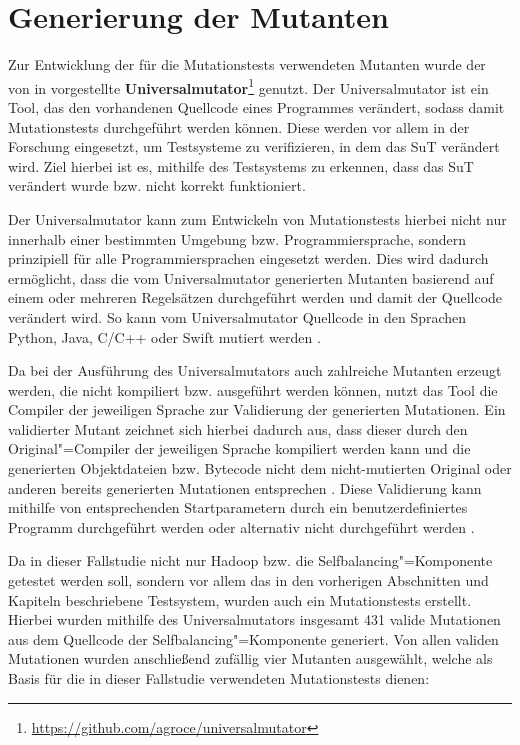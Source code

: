 \section{Generierung der Mutanten}
\label{sec:implMutationTests}

Zur Entwicklung der für die Mutationstests verwendeten Mutanten wurde der von \citeauthor{Groce2018} in \cite{Groce2018} vorgestellte \textbf{Universalmutator}\footnote{\url{https://github.com/agroce/universalmutator}} genutzt.
Der Universalmutator ist ein Tool, das den vorhandenen Quellcode eines Programmes verändert, sodass damit Mutationstests durchgeführt werden können.
Diese werden vor allem in der Forschung eingesetzt, um Testsysteme zu verifizieren, in dem das \ac{SuT} verändert wird.
Ziel hierbei ist es, mithilfe des Testsystems zu erkennen, dass das \ac{SuT} verändert wurde bzw. nicht korrekt funktioniert.

Der Universalmutator kann zum Entwickeln von Mutationstests hierbei nicht nur innerhalb einer bestimmten Umgebung bzw. Programmiersprache, sondern prinzipiell für alle Programmiersprachen eingesetzt werden.
Dies wird dadurch ermöglicht, dass die vom Universalmutator generierten Mutanten basierend auf einem oder mehreren Regelsätzen durchgeführt werden und damit der Quellcode verändert wird.
So kann vom Universalmutator Quellcode \uA in den Sprachen Python, Java, C/C++ oder Swift mutiert werden \cite{Groce2018}.

Da bei der Ausführung des Universalmutators auch zahlreiche Mutanten erzeugt werden, die nicht kompiliert bzw. ausgeführt werden können, nutzt das Tool die Compiler der jeweiligen Sprache zur Validierung der generierten Mutationen.
Ein validierter Mutant zeichnet sich hierbei dadurch aus, dass dieser durch den Original"=Compiler der jeweiligen Sprache kompiliert werden kann und die generierten Objektdateien bzw. Bytecode nicht dem nicht-mutierten Original oder anderen bereits generierten Mutationen entsprechen \cite{Groce2018}.
Diese Validierung kann mithilfe von entsprechenden Startparametern durch ein benutzerdefiniertes Programm durchgeführt werden oder alternativ nicht durchgeführt werden \cite{Groce2018,UniversalmutatorSourceGenmutants}.

Da in dieser Fallstudie nicht nur Hadoop bzw. die Selfbalancing"=Komponente getestet werden soll, sondern vor allem das in den vorherigen Abschnitten und Kapiteln beschriebene Testsystem, wurden auch ein Mutationstests erstellt.
Hierbei wurden mithilfe des Universalmutators insgesamt 431 valide Mutationen aus dem Quellcode der Selfbalancing"=Komponente generiert.
Von allen validen Mutationen wurden anschließend zufällig vier Mutanten ausgewählt, welche als Basis für die in dieser Fallstudie verwendeten Mutationstests dienen:

